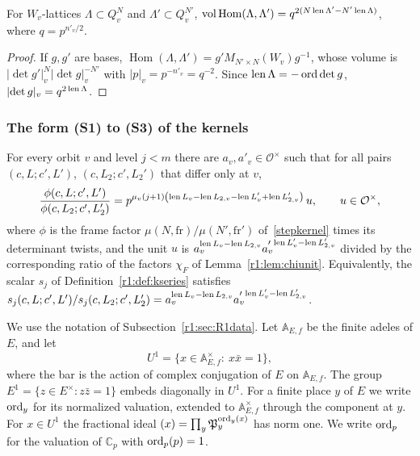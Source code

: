 \begin{lemma}\label{r1:lem:vol}
For $W_v$-lattices $\Lambda\subset Q_v^{N}$ and $\Lambda'\subset Q_v^{N'}$, $\operatorname{vol}\operatorname{Hom}(\Lambda,\Lambda')=q^{2(N\operatorname{len}\Lambda'-N'\operatorname{len}\Lambda)}$, where $q=p^{n'_v/2}$.
\end{lemma}

\begin{proof}
If $g,g'$ are bases, $\operatorname{Hom}(\Lambda,\Lambda')=g'M_{N'\times N}(W_v)g^{-1}$, whose volume is $\lvert\det g'\rvert_v^{N}\lvert\det g\rvert_v^{-N'}$ with $\lvert p\rvert_v=p^{-n'_v}=q^{-2}$. Since $\operatorname{len}\Lambda=-\operatorname{ord}\det g$, $\lvert\det g\rvert_v=q^{2\operatorname{len}\Lambda}$.
\end{proof}

\subsubsection{The form (S1) to (S3) of the kernels}

\begin{hypothesis}[normalization, (N1)]\label{r1:hyp:H1}
For every orbit $v$ and level $j<m$ there are $a_v,a'_v\in\mathcal O^\times$ such that for all pairs $(c,L;c',L')$, $(c,L_2;c',L_2')$ that differ only at $v$,
\[
\frac{\phi(c,L;c',L')}{\phi(c,L_2;c',L_2')}=p^{\mu_v(j+1)\left(\operatorname{len} L_v-\operatorname{len} L_{2,v}-\operatorname{len} L'_v+\operatorname{len} L'_{2,v}\right)}\,u,\qquad u\in\mathcal O^\times,
\]
where $\phi$ is the frame factor $\mu(N,\mathrm{fr})/\mu(N',\mathrm{fr}')$ of~\eqref{stepkernel} times its determinant twists, and the unit $u$ is $a_v^{\operatorname{len} L_v-\operatorname{len} L_{2,v}}a_v'^{\,\operatorname{len} L'_v-\operatorname{len} L'_{2,v}}$ divided by the corresponding ratio of the factors $\chi_F$ of Lemma~\ref{r1:lem:chiunit}. Equivalently, the scalar $s_j$ of Definition~\ref{r1:def:kseries} satisfies $s_j(c,L;c',L')/s_j(c,L_2;c',L_2')=a_v^{\operatorname{len} L_v-\operatorname{len} L_{2,v}}a_v'^{\,\operatorname{len} L'_v-\operatorname{len} L'_{2,v}}$.
\end{hypothesis}

We use the notation of Subsection~\ref{r1:sec:R1data}. Let $\mathbb A_{E,f}$ be the finite adeles of $E$, and let
\[
U^1=\{x\in\mathbb A_{E,f}^\times:\ x\bar x=1\},
\]
where the bar is the action of complex conjugation of $E$ on $\mathbb A_{E,f}$. The group $E^1=\{z\in E^\times:z\bar z=1\}$ embeds diagonally in $U^1$. For a finite place $y$ of $E$ we write $\operatorname{ord}_y$ for its normalized valuation, extended to $\mathbb A_{E,f}^\times$ through the component at $y$. For $x\in U^1$ the fractional ideal $(x)=\prod_y\mathfrak P_y^{\operatorname{ord}_y(x)}$ has norm one. We write $\operatorname{ord}_p$ for the valuation of $\mathbb C_p$ with $\operatorname{ord}_p(p)=1$.

